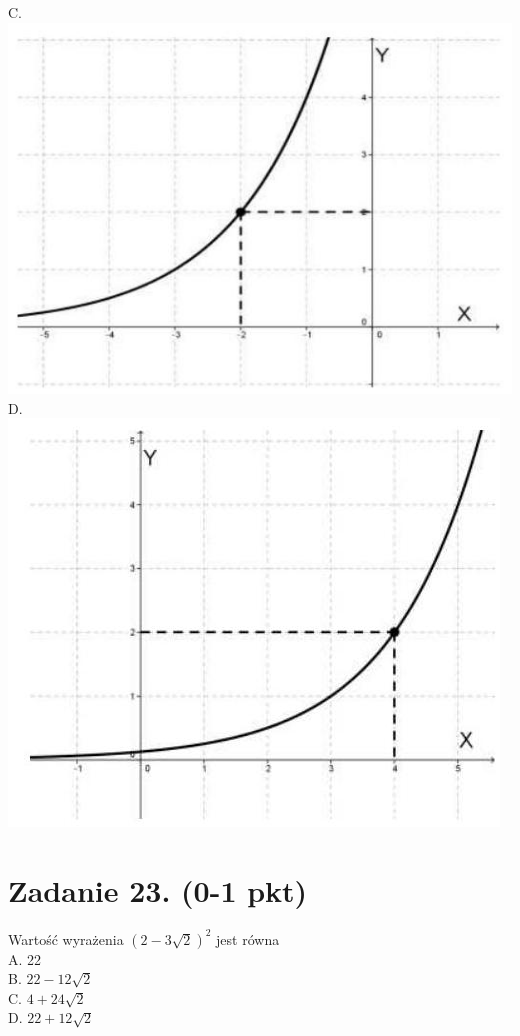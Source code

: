 \documentclass[10pt]{article}
\begin{document}
C.\\
\includegraphics[max width=\textwidth, center]{2024_11_21_b8ac5f500a5bbb1b4ec5g-10}\\
D.\\
\includegraphics[max width=\textwidth, center]{2024_11_21_b8ac5f500a5bbb1b4ec5g-10(2)}

\section*{Zadanie 23. (0-1 pkt)}
Wartość wyrażenia \((2-3 \sqrt{2})^{2}\) jest równa\\
A. 22\\
B. \(22-12 \sqrt{2}\)\\
C. \(4+24 \sqrt{2}\)\\
D. \(22+12 \sqrt{2}\)
\end{document}

